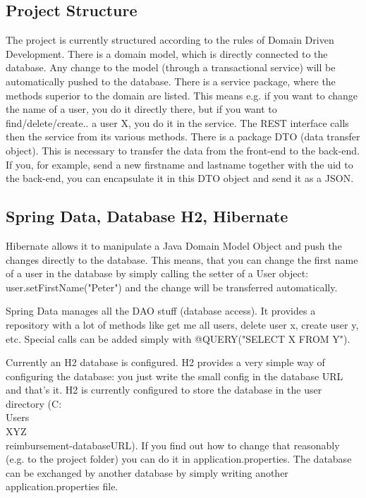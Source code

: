 \subsection{Project Structure}
The project is currently structured according to the rules of Domain Driven Development. There is a domain model, which is directly connected to the database. Any change to the model (through a transactional service) will be automatically pushed to the database. There is a service package, where the methods superior to the domain are listed. This means e.g. if you want to change the name of a user, you do it directly there, but if you want to find/delete/create.. a user X, you do it in the service. The REST interface calls then the service from its various methods. There is a package DTO (data transfer object). This is necessary to transfer the data from the front-end to the back-end. If you, for example, send a new firstname and lastname together with the uid to the back-end, you can encapsulate it in this DTO object and send it as a JSON.


\subsection{Spring Data, Database H2, Hibernate}
Hibernate allows it to manipulate a Java Domain Model Object and push the changes directly to the database. This means, that you can change the first name of a user in the database by simply calling the setter of a User object: user.setFirstName("Peter") and the change will be transferred automatically.\par
Spring Data manages all the DAO stuff (database access). It provides a repository with a lot of methods like get me all users, delete user x, create user y, etc. Special calls can be added simply with @QUERY("SELECT X FROM Y").\par


Currently an H2 database is configured. H2 provides a very simple way of configuring the database: you just write the small config in the database URL and that’s it. H2 is currently configured to store the database in the user directory (C:\\Users\\XYZ\\reimbursement-databaseURL). If you find out how to change that reasonably (e.g. to the project folder) you can do it in application.properties. The database can be exchanged by another database by simply writing another application.properties file.


